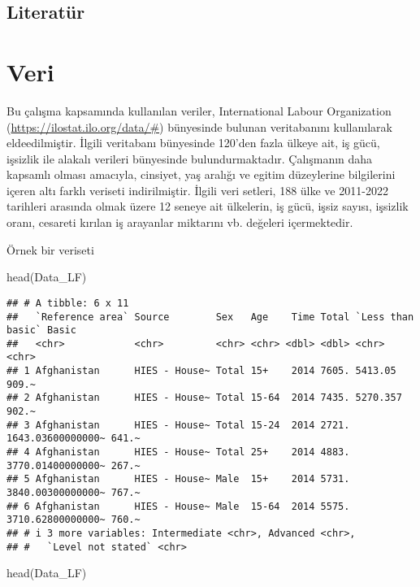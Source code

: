 \documentclass[
]{article}
\newenvironment{Shaded}{\begin{snugshade}}{\end{snugshade}}
\newcommand{\FunctionTok}[1]{\textcolor[rgb]{0.00,0.00,0.00}{#1}}
\newcommand{\NormalTok}[1]{#1}
\begin{document}
\hypertarget{literatuxfcr}{%
\subsection{Literatür}\label{literatuxfcr}}

\hypertarget{veri}{%
\section{Veri}\label{veri}}

Bu çalışma kapsamında kullanılan veriler, International Labour
Organization (\url{https://ilostat.ilo.org/data/\#}) bünyesinde bulunan
veritabanını kullanılarak eldeedilmiştir. İlgili veritabanı bünyesinde
120'den fazla ülkeye ait, iş gücü, işsizlik ile alakalı verileri
bünyesinde bulundurmaktadır. Çalışmanın daha kapsamlı olması amacıyla,
cinsiyet, yaş aralığı ve egitim düzeylerine bilgilerini içeren altı
farklı veriseti indirilmiştir. İlgili veri setleri, 188 ülke ve
2011-2022 tarihleri arasında olmak üzere 12 seneye ait ülkelerin, iş
gücü, işsiz sayısı, işsizlik oranı, cesareti kırılan iş arayanlar
miktarını vb. değeleri içermektedir.

Örnek bir veriseti

\begin{Shaded}
\begin{Highlighting}[]
\FunctionTok{head}\NormalTok{(Data\_LF)}
\end{Highlighting}
\end{Shaded}

\begin{verbatim}
## # A tibble: 6 x 11
##   `Reference area` Source        Sex   Age    Time Total `Less than basic` Basic
##   <chr>            <chr>         <chr> <chr> <dbl> <dbl> <chr>             <chr>
## 1 Afghanistan      HIES - House~ Total 15+    2014 7605. 5413.05           909.~
## 2 Afghanistan      HIES - House~ Total 15-64  2014 7435. 5270.357          902.~
## 3 Afghanistan      HIES - House~ Total 15-24  2014 2721. 1643.03600000000~ 641.~
## 4 Afghanistan      HIES - House~ Total 25+    2014 4883. 3770.01400000000~ 267.~
## 5 Afghanistan      HIES - House~ Male  15+    2014 5731. 3840.00300000000~ 767.~
## 6 Afghanistan      HIES - House~ Male  15-64  2014 5575. 3710.62800000000~ 760.~
## # i 3 more variables: Intermediate <chr>, Advanced <chr>,
## #   `Level not stated` <chr>
\end{verbatim}

\begin{Shaded}
\begin{Highlighting}[]
\FunctionTok{head}\NormalTok{(Data\_LF)}
\end{Highlighting}
\end{Shaded}
\end{document}
